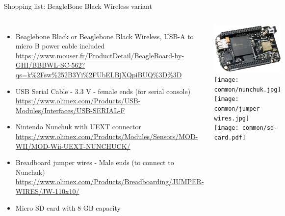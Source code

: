 \begin{frame}[fragile]{Shopping list: BeagleBone Black Wireless variant}
  \begin{columns}
    \begin{itemize}
    \item Beaglebone Black or Beaglebone Black Wireless, USB-A to
      micro B power cable included
      {\fontsize{6}{6}\selectfont
        \url{https://www.mouser.fr/ProductDetail/BeagleBoard-by-GHI/BBBWL-SC-562?qs=k%2Fsw%252B3Yi%2FUbELBjXQpiBUQ%3D%3D}
      }
    \item USB Serial Cable - 3.3 V - female ends (for serial console)
      {\fontsize{6}{6}\selectfont
        \url{https://www.olimex.com/Products/USB-Modules/Interfaces/USB-SERIAL-F}
      }
    \item Nintendo Nunchuk with UEXT connector
      {\fontsize{6}{6}\selectfont
        \url{https://www.olimex.com/Products/Modules/Sensors/MOD-WII/MOD-Wii-UEXT-NUNCHUCK/}
      }
    \item Breadboard jumper wires - Male ends (to connect to Nunchuk)
      {\fontsize{6}{6}\selectfont
        \url{https://www.olimex.com/Products/Breadboarding/JUMPER-WIRES/JW-110x10/}
      }
    \item Micro SD card with 8 GB capacity
    \end{itemize}
    \begin{center}
      \includegraphics[height=0.2\textheight]{slides/beagleboneblack-board/beagleboneblack.png} \\
      \texttt{[image: common/nunchuk.jpg]} \\
      \texttt{[image: common/jumper-wires.jpg]} \\
      \texttt{[image: common/sd-card.pdf]}
    \end{center}
  \end{columns}
\end{frame}

